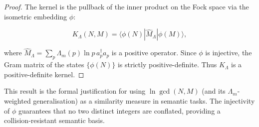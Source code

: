 \begin{proof}
The kernel is the pullback of the inner product on the Fock space via the isometric embedding $\phi$:

\[
K_\Lambda(N,M) = \langle \phi(N) | \hat{M}_\Lambda | \phi(M) \rangle,
\]

where $\hat{M}_\Lambda = \sum_p \Lambda_m(p) \ln p \, a_p^\dagger a_p$ is a positive operator. Since $\phi$ is injective, the Gram matrix of the states $\{\phi(N)\}$ is strictly positive-definite. Thus $K_\Lambda$ is a positive-definite kernel.

\end{proof}

\begin{remark}
This result is the formal justification for using $\ln\gcd(N,M)$ (and its $\Lambda_m$-weighted generalisation) as a similarity measure in semantic tasks. The injectivity of $\phi$ guarantees that no two distinct integers are conflated, providing a collision‑resistant semantic basis.
\end{remark}
